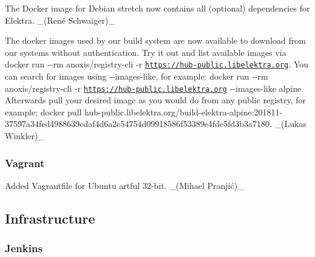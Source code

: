 \begin{DoxyItemize}
\item The Docker image for Debian stretch now contains all (optional) dependencies for Elektra. \+\_\+(René Schwaiger)\+\_\+
\item The docker images used by our build system are now available to download from our systems without authentication. Try it out and list available images via {\ttfamily docker run -\/-\/rm anoxis/registry-\/cli -\/r \href{https://hub-public.libelektra.org}{\tt https\+://hub-\/public.\+libelektra.\+org}}. You can search for images using {\ttfamily -\/-\/images-\/like}, for example\+: {\ttfamily docker run -\/-\/rm anoxis/registry-\/cli -\/r \href{https://hub-public.libelektra.org}{\tt https\+://hub-\/public.\+libelektra.\+org} -\/-\/images-\/like alpine}. Afterwards pull your desired image as you would do from any public registry, for example\+: {\ttfamily docker pull hub-\/public.\+libelektra.\+org/build-\/elektra-\/alpine\+:201811-\/37597a34fed4988639cdaf4d6a2c54754d09918586f53389e4fde5fd3b3a7180}. \+\_\+(\+Lukas Winkler)\+\_\+
\end{DoxyItemize}

\subsubsection*{Vagrant}


\begin{DoxyItemize}
\item Added Vagrantfile for Ubuntu artful 32-\/bit. \+\_\+(Mihael Pranjić)\+\_\+
\end{DoxyItemize}

\subsection*{Infrastructure}

\subsubsection*{Jenkins}


